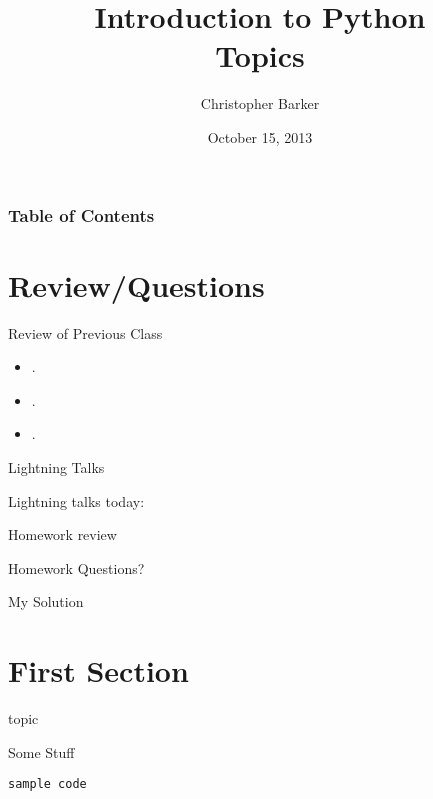 \documentclass{beamer}
\title[Intro to Python: Week 3]{Introduction  to Python\\ Topics}
\author{Christopher Barker}
\institute{UW Continuing Education}
\date{October 15, 2013}
\begin{document}
\begin{frame}
  \titlepage
\end{frame}

\begin{frame}
\frametitle{Table of Contents}
  \tableofcontents
\end{frame}


\section{Review/Questions}

\begin{frame}{Review of Previous Class}

\begin{itemize}
  \item .
  \item .
  \item .
\end{itemize}

\end{frame}


\begin{frame}{Lightning Talks}

\vfill
{\LARGE Lightning talks today:}

\vfill
{\Large
 

\vfill

\vfill

\vfill

}
\vfill

\end{frame}


\begin{frame}{Homework review}

  \vfill
  {\Large Homework Questions? }

  \vfill
  {\Large My Solution}

  \vfill

\end{frame}

\section{First Section}

\begin{frame}[fragile]{topic}

{\Large Some Stuff}

\begin{verbatim}
sample code
\end{verbatim}


\end{frame}
\end{document}
